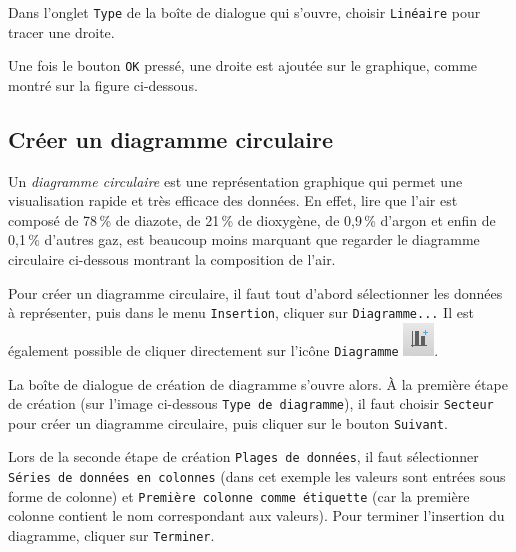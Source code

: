 Dans l'onglet \texttt{Type} de la boîte de dialogue qui s'ouvre, choisir \texttt{Linéaire} pour tracer une droite.


Une fois le bouton \texttt{OK} pressé, une droite est ajoutée sur le graphique, comme montré sur la figure ci-dessous.




\subsection{Créer un diagramme circulaire}\label{Calc2DiagCirculaire}

Un \emph{diagramme circulaire} est une représentation graphique qui permet une visualisation rapide et très efficace des données. En effet, lire que l'air est composé de 78\,\% de diazote, de 21\,\% de dioxygène, de 0,9\,\% d'argon et enfin de 0,1\,\% d'autres gaz, est beaucoup moins marquant que regarder le diagramme circulaire ci-dessous montrant la composition de l'air.


Pour créer un diagramme circulaire, il faut tout d'abord sélectionner les données à représenter, puis dans le menu \texttt{Insertion}, cliquer sur \texttt{Diagramme...} Il est également possible de cliquer directement sur l'icône \texttt{Diagramme} \includegraphics[width=.6cm]{./images/tableur02/iconeDiagramme}.


La boîte de dialogue de création de diagramme s'ouvre alors. À la première étape de création (sur l'image ci-dessous  \texttt{Type de diagramme}), il faut choisir \texttt{Secteur} pour créer un diagramme circulaire, puis cliquer sur le bouton \texttt{Suivant}.      



Lors de la seconde étape de création  \texttt{Plages de données}, il faut sélectionner \texttt{Séries de données en colonnes} (dans cet exemple les valeurs sont entrées sous forme de colonne) et \texttt{Première colonne comme étiquette} (car la première colonne contient le nom correspondant aux valeurs). Pour terminer l'insertion du diagramme, cliquer sur \texttt{Terminer}. 

